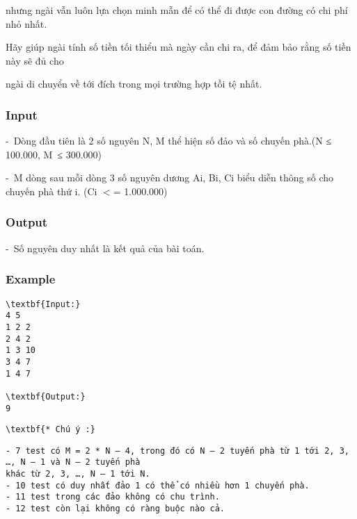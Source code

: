    nhưng ngài vẫn luôn lựa chọn minh mẫn để có thể đi được con đường có chi phí nhỏ nhất.  

   Hãy giúp ngài tính số tiền tối thiểu mà ngày cần chi ra, để đảm bảo rằng số tiền này sẽ đủ cho  

   ngài di chuyển về tới đích trong mọi trường hợp tồi tệ nhất.  



\subsubsection{   Input  }

   - Dòng đầu tiên là 2 số nguyên N, M thể hiện số đảo và số chuyến phà.(N ≤ 100.000, M ≤ 300.000)  

   - M dòng sau mỗi dòng 3 số nguyên dương Ai, Bi, Ci biểu diễn thông số cho chuyến phà thứ i. (Ci $<$= 1.000.000)  

\subsubsection{   Output  }

   - Số nguyên duy nhất là kết quả của bài toán.  

\subsubsection{   Example  }
\begin{verbatim}
\textbf{Input:}
4 5
1 2 2
2 4 2
1 3 10
3 4 7
1 4 7

\textbf{Output:}
9
\end{verbatim}
\begin{verbatim}
\textbf{* Chú ý :}\end{verbatim}
\begin{verbatim}
- 7 test có M = 2 * N – 4, trong đó có N – 2 tuyến phà từ 1 tới 2, 3, …, N – 1 và N – 2 tuyến phà
khác từ 2, 3, …, N – 1 tới N.
- 10 test có duy nhất đảo 1 có thể có nhiều hơn 1 chuyến phà.
- 11 test trong các đảo không có chu trình.
- 12 test còn lại không có ràng buộc nào cả. \end{verbatim}